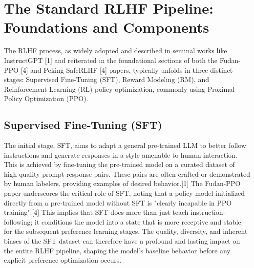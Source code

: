 \documentclass[10pt,journal,compsoc]{IEEEtran} %
\begin{document}
\section{The Standard RLHF Pipeline: Foundations and Components}
\label{sec:standard_rlhf}

The RLHF process, as widely adopted and described in seminal works like InstructGPT [1] and reiterated in the foundational sections of both the Fudan-PPO [4] and Peking-SafeRLHF [4] papers, typically unfolds in three distinct stages: Supervised Fine-Tuning (SFT), Reward Modeling (RM), and Reinforcement Learning (RL) policy optimization, commonly using Proximal Policy Optimization (PPO).

\subsection{Supervised Fine-Tuning (SFT)}
The initial stage, SFT, aims to adapt a general pre-trained LLM to better follow instructions and generate responses in a style amenable to human interaction. This is achieved by fine-tuning the pre-trained model on a curated dataset of high-quality prompt-response pairs. These pairs are often crafted or demonstrated by human labelers, providing examples of desired behavior.[1] The Fudan-PPO paper underscores the critical role of SFT, noting that a policy model initialized directly from a pre-trained model without SFT is "clearly incapable in PPO training".[4] This implies that SFT does more than just teach instruction-following; it conditions the model into a state that is more receptive and stable for the subsequent preference learning stages. The quality, diversity, and inherent biases of the SFT dataset can therefore have a profound and lasting impact on the entire RLHF pipeline, shaping the model's baseline behavior before any explicit preference optimization occurs.
\end{document}
